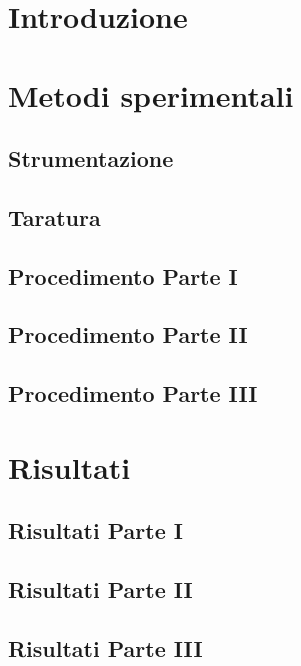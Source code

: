 \documentclass[a4paper,10pt,oneside]{memoir}
\begin{document}
\tableofcontents*

\newpage
\normalsize
{}
\section{Introduzione}
 

\section{Metodi sperimentali}
\subsection{Strumentazione}

\subsection{Taratura}

\subsection{Procedimento Parte I}

\subsection{Procedimento Parte II}


\subsection{Procedimento Parte III}

\newpage
\section{Risultati}
\subsection{Risultati Parte I}\label{sec:risultati 1}


\subsection{Risultati Parte II}


\subsection{Risultati Parte III}

\newpage
\end{document}
